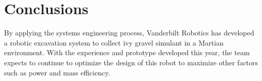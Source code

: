 \documentclass[class=article, crop=false]{standalone}
\begin{document}
	\section{Conclusions}
		By applying the systems engineering process, Vanderbilt Robotics has developed a robotic excavation system to collect ivy gravel simulant in a Martian environment. With the experience and prototype developed this year, the team expects to continue to optimize the design of this robot to maximize other factors such as power and mass efficiency.
\end{document}
